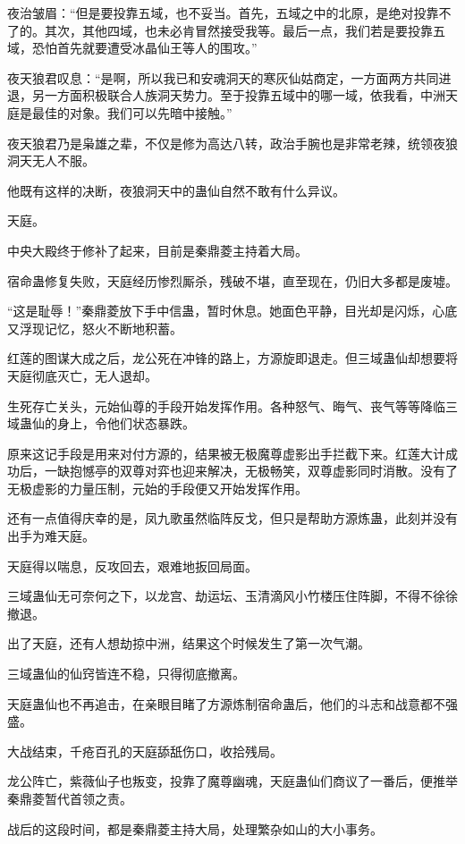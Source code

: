 \begin{this_body}
夜治皱眉：“但是要投靠五域，也不妥当。首先，五域之中的北原，是绝对投靠不了的。其次，其他四域，也未必肯冒然接受我等。最后一点，我们若是要投靠五域，恐怕首先就要遭受冰晶仙王等人的围攻。”

夜天狼君叹息：“是啊，所以我已和安魂洞天的寒灰仙姑商定，一方面两方共同进退，另一方面积极联合人族洞天势力。至于投靠五域中的哪一域，依我看，中洲天庭是最佳的对象。我们可以先暗中接触。”

夜天狼君乃是枭雄之辈，不仅是修为高达八转，政治手腕也是非常老辣，统领夜狼洞天无人不服。

他既有这样的决断，夜狼洞天中的蛊仙自然不敢有什么异议。

天庭。

中央大殿终于修补了起来，目前是秦鼎菱主持着大局。

宿命蛊修复失败，天庭经历惨烈厮杀，残破不堪，直至现在，仍旧大多都是废墟。

“这是耻辱！”秦鼎菱放下手中信蛊，暂时休息。她面色平静，目光却是闪烁，心底又浮现记忆，怒火不断地积蓄。

红莲的图谋大成之后，龙公死在冲锋的路上，方源旋即退走。但三域蛊仙却想要将天庭彻底灭亡，无人退却。

生死存亡关头，元始仙尊的手段开始发挥作用。各种怒气、晦气、丧气等等降临三域蛊仙的身上，令他们状态暴跌。

原来这记手段是用来对付方源的，结果被无极魔尊虚影出手拦截下来。红莲大计成功后，一缺抱憾亭的双尊对弈也迎来解决，无极畅笑，双尊虚影同时消散。没有了无极虚影的力量压制，元始的手段便又开始发挥作用。

还有一点值得庆幸的是，凤九歌虽然临阵反戈，但只是帮助方源炼蛊，此刻并没有出手为难天庭。

天庭得以喘息，反攻回去，艰难地扳回局面。

三域蛊仙无可奈何之下，以龙宫、劫运坛、玉清滴风小竹楼压住阵脚，不得不徐徐撤退。

出了天庭，还有人想劫掠中洲，结果这个时候发生了第一次气潮。

三域蛊仙的仙窍皆连不稳，只得彻底撤离。

天庭蛊仙也不再追击，在亲眼目睹了方源炼制宿命蛊后，他们的斗志和战意都不强盛。

大战结束，千疮百孔的天庭舔舐伤口，收拾残局。

龙公阵亡，紫薇仙子也叛变，投靠了魔尊幽魂，天庭蛊仙们商议了一番后，便推举秦鼎菱暂代首领之责。

战后的这段时间，都是秦鼎菱主持大局，处理繁杂如山的大小事务。


\end{this_body}
